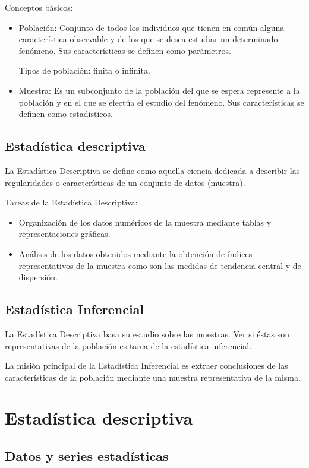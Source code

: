 \documentclass[12pt]{report}
\begin{document}
Conceptos básicos:
\begin{itemize}
\item Población: Conjunto de todos los individuos que tienen en común alguna
característica observable y de los que se desea estudiar un determinado fenómeno. Sus
 características se definen como  parámetros.

Tipos de población: finita o infinita.
\item Muestra: Es un subconjunto de la población del que se espera
represente a la  población y
 en el que se efectúa el estudio del fenómeno. Sus
características se definen como  estadísticos.
\end{itemize}
\subsection{Estadística descriptiva}

La Estadística Descriptiva se define como aquella ciencia dedicada a describir las
regularidades o características de un conjunto de datos (muestra).

Tareas de la Estadística Descriptiva:
\begin{itemize}
\item Organización de los datos
numéricos de la muestra mediante tablas y  representaciones gráficas.
\item Análisis de los datos obtenidos mediante
la obtención de índices representativos de la muestra como son las medidas de tendencia
central y  de dispersión.
\end{itemize}

\subsection{Estadística Inferencial}

La Estadística Descriptiva basa su estudio sobre las muestras. Ver si éstas son
representativas de la población es  tarea de la estadística inferencial.

La misión principal de la Estadística Inferencial es extraer conclusiones de las
características de la población mediante una muestra representativa de la misma.


\section{Estadística descriptiva}

\subsection{Datos y series estadísticas}
\end{document}
